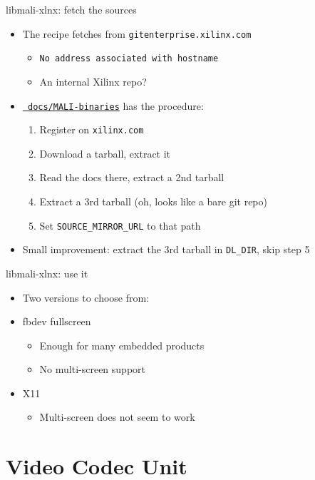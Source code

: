 \documentclass[xetex,table]{beamer}
\begin{document}
\begin{frame}{libmali-xlnx: fetch the sources}
  \begin{itemize}
  \item The recipe fetches from {\tt gitenterprise.xilinx.com}
    \begin{itemize}
    \item[\textrightarrow] {\tt No address associated with hostname}
    \item An internal Xilinx repo?
    \end{itemize}
  \item
    \href{https://github.com/xilinx/meta-xilinx/blob/rel-v2017.4/docs/MALI-binaries}{\tt
      docs/MALI-binaries} has the procedure:
    \begin{enumerate}
    \item Register on {\tt xilinx.com}
    \item Download a tarball, extract it
    \item Read the docs there, extract a 2nd tarball
    \item Extract a 3rd tarball (oh, looks like a bare git repo)
    \item Set {\tt SOURCE\_MIRROR\_URL} to that path
    \end{enumerate}
  \item Small improvement: extract the 3rd tarball in {\tt DL\_DIR}, skip step 5
  \end{itemize}
\end{frame}

\begin{frame}{libmali-xlnx: use it}
   \begin{itemize}
  \item Two versions to choose from:
  \item fbdev fullscreen
    \begin{itemize}
    \item Enough for many embedded products
    \item No multi-screen support
    \end{itemize}
  \item X11
    \begin{itemize}
    \item Multi-screen does not seem to work
    \end{itemize}
  \end{itemize}
\end{frame}

\section{Video Codec Unit}
\end{document}
